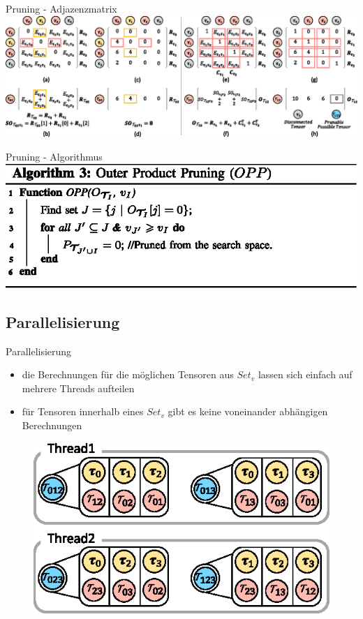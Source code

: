 \documentclass{beamer}
\begin{document}
\begin{frame}{Pruning - Adjazenzmatrix}
	\includegraphics[scale=0.2]{figure_05}
\end{frame}

\begin{frame}{Pruning - Algorithmus}
	\includegraphics[scale=0.25]{algorithm_03}
\end{frame}
\note[itemize]{
	\item
}
\subsection{Parallelisierung}

\begin{frame}{Parallelisierung}
	\begin{itemize}
		\item die Berechnungen für die möglichen Tensoren aus $Set_v$ lassen sich einfach auf mehrere Threads aufteilen
		\item für Tensoren innerhalb eines $Set_v$ gibt es keine voneinander abhängigen Berechnungen
	\end{itemize}
	\begin{figure}
		\includegraphics{figure_07}
	\end{figure}
\end{frame}
\end{document}
